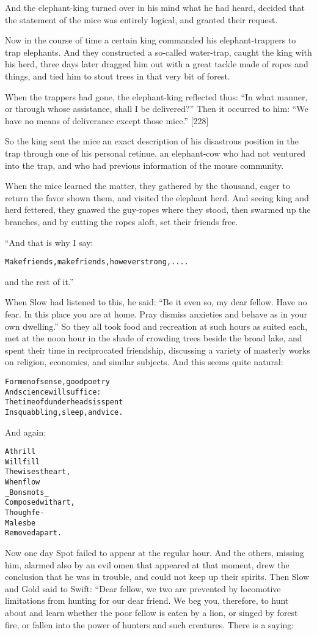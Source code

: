 \documentclass{article}
\renewenvironment{verbatim}{\begin{alltt}\normalfont\begin{centering}}{\end{centering}\end{alltt}}
\begin{document}
And the elephant-king turned over in his mind what he had heard,
decided that the statement of the mice was entirely logical, and
granted their request.

Now in the course of time a certain king commanded his
elephant-trappers to trap elephants. And they constructed a
so-called water-trap, caught the king with his herd, three days
later dragged him out with a great tackle made of ropes and things,
and tied him to stout trees in that very bit of forest.

When the trappers had gone, the elephant-king reflected thus:
``In what manner, or through whose assistance, shall I be delivered?''
Then it occurred to him:
``We have no means of deliverance except those mice.'' [228]

So the king sent the mice an exact description of his disastrous
position in the trap through one of his personal retinue, an
elephant-cow who had not ventured into the trap, and who had
previous information of the mouse community.

When the mice learned the matter, they gathered by the thousand,
eager to return the favor shown them, and visited the elephant
herd. And seeing king and herd fettered, they gnawed the guy-ropes
where they stood, then swarmed up the branches, and by cutting the
ropes aloft, set their friends free.

“And that is why I say:

\begin{verbatim}
Make friends, make friends, however strong, ....
\end{verbatim}
and the rest of it.”

When Slow had listened to this, he said:
``Be it even so, my dear fellow. Have no fear. In this place you are at home. Pray dismiss anxieties and behave as in your own dwelling.''
So they all took food and recreation at such hours as suited each,
met at the noon hour in the shade of crowding trees beside the
broad lake, and spent their time in reciprocated friendship,
discussing a variety of masterly works on religion, economics, and
similar subjects. And this seems quite natural:

\begin{verbatim}
For men of sense, good poetry
    And science will suffice:
The time of dunderheads is spent
    In squabbling, sleep, and vice.
\end{verbatim}
And again:

\begin{verbatim}
A thrill
Will fill
    The wisest heart,
When flow
_Bons mots_
    Composed with art,
Though fe-
Males be
    Removed apart.
\end{verbatim}
Now one day Spot failed to appear at the regular hour. And the
others, missing him, alarmed also by an evil omen that appeared at
that moment, drew the conclusion that he was in trouble, and could
not keep up their spirits. Then Slow and Gold said to Swift: “Dear
fellow, we two are prevented by locomotive limitations from hunting
for our dear friend. We beg you, therefore, to hunt about and learn
whether the poor fellow is eaten by a lion, or singed by forest
fire, or fallen into the power of hunters and such creatures. There
is a saying:
\end{document}
